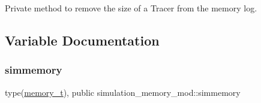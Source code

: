 Private method to remove the size of a Tracer from the memory log. 

\subsection{Variable Documentation}
\mbox{\label{namespacesimulation__memory__mod_af3e2714796469b4b1ec247569b184088}} 
\subsubsection{\texorpdfstring{simmemory}{simmemory}}
{\footnotesize\ttfamily type(\hyperlink{structsimulation__memory__mod_1_1memory__t}{memory\+\_\+t}), public simulation\+\_\+memory\+\_\+mod\+::simmemory}

